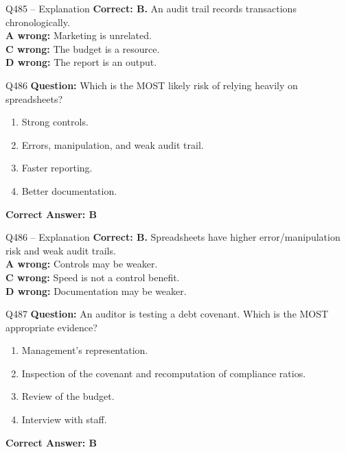\documentclass[aspectratio=169,10pt]{beamer}
\begin{document}
	\begin{frame}[t]{Q485 -- Explanation}
		\small
		\textbf{Correct: B.} An audit trail records transactions chronologically. \\[4pt]
		\textbf{A wrong:} Marketing is unrelated. \\[2pt]
		\textbf{C wrong:} The budget is a resource. \\[2pt]
		\textbf{D wrong:} The report is an output.
	\end{frame}
	
	\begin{frame}[t]{Q486}
		\small
		\textbf{Question:} Which is the MOST likely risk of relying heavily on spreadsheets?
		\begin{enumerate}[label=\Alph*.,itemsep=1pt,topsep=2pt]
			\item Strong controls.
			\item Errors, manipulation, and weak audit trail.
			\item Faster reporting.
			\item Better documentation.
		\end{enumerate}
		\vspace{4pt}
		\textbf{Correct Answer: B}
	\end{frame}
	
	\begin{frame}[t]{Q486 -- Explanation}
		\small
		\textbf{Correct: B.} Spreadsheets have higher error/manipulation risk and weak audit trails. \\[4pt]
		\textbf{A wrong:} Controls may be weaker. \\[2pt]
		\textbf{C wrong:} Speed is not a control benefit. \\[2pt]
		\textbf{D wrong:} Documentation may be weaker.
	\end{frame}
	
	\begin{frame}[t]{Q487}
		\small
		\textbf{Question:} An auditor is testing a debt covenant. Which is the MOST appropriate evidence?
		\begin{enumerate}[label=\Alph*.,itemsep=1pt,topsep=2pt]
			\item Management's representation.
			\item Inspection of the covenant and recomputation of compliance ratios.
			\item Review of the budget.
			\item Interview with staff.
		\end{enumerate}
		\vspace{4pt}
		\textbf{Correct Answer: B}
	\end{frame}
	
\end{document}
